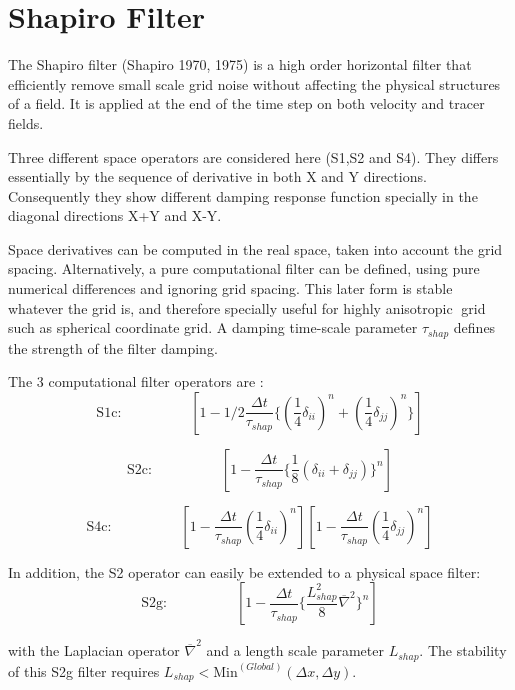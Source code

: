 
\section{Shapiro Filter} 

The Shapiro filter (Shapiro 1970, 1975) is a high order horizontal 
filter that efficiently remove small scale grid noise 
without affecting the physical structures of a field. 
It is applied at the end of the time step %
on both velocity and tracer fields.

Three different space operators are considered here (S1,S2 and S4).
They differs essentially by the sequence of derivative in
both X and Y directions. Consequently they show different 
damping response function specially in the diagonal directions 
X+Y and X-Y.

Space derivatives can be computed in the real space, 
taken into account the grid spacing. 
Alternatively, a pure computational filter can be defined,
using pure numerical differences and ignoring 
grid spacing. 
This later form is stable whatever the grid is, and therefore
specially useful for highly anisotropic grid such as spherical 
coordinate grid.
A damping time-scale parameter $\tau_{shap}$ 
defines the strength of the filter damping.

The 3 computational filter operators are :
$$
\mathrm{S1c:}\hspace{2cm}
[1 - 1/2 \frac{\Delta t}{\tau_{shap}}
   \{ (\frac{1}{4}\delta_{ii})^n 
    + (\frac{1}{4}\delta_{jj})^n \} ] 
$$

$$
\mathrm{S2c:}\hspace{2cm}
[1 - \frac{\Delta t}{\tau_{shap}} 
\{ \frac{1}{8} (\delta_{ii} + \delta_{jj}) \}^n]
$$

$$
\mathrm{S4c:}\hspace{2cm}
[1 - \frac{\Delta t}{\tau_{shap}} (\frac{1}{4}\delta_{ii})^n]
[1 - \frac{\Delta t}{\tau_{shap}} (\frac{1}{4}\delta_{jj})^n]
$$

In addition, the S2 operator can easily be extended to 
a physical space filter: 
$$
\mathrm{S2g:}\hspace{2cm}
[1 - \frac{\Delta t}{\tau_{shap}} 
\{ \frac{L_{shap}^2}{8} \overline{\nabla}^2 \}^n]
$$

with the Laplacian operator $\overline{\nabla}^2 $
and a length scale parameter $L_{shap}$.
The stability of this S2g filter requires 
$L_{shap} < \mathrm{Min}^{(Global)}(\Delta x,\Delta y)$.

